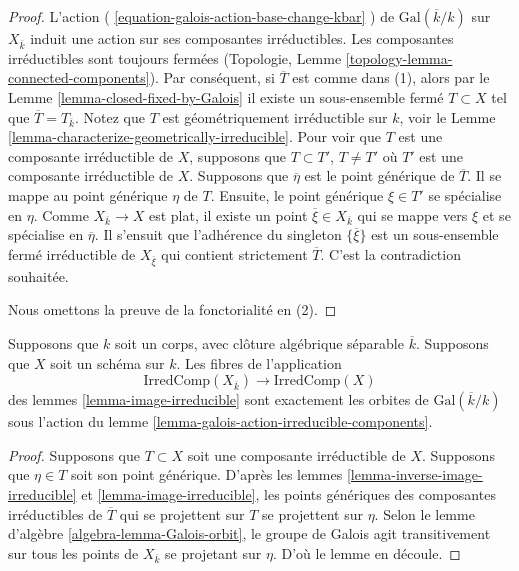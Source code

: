\begin{proof}
L'action ( \ref{equation-galois-action-base-change-kbar} ) de
$\text{Gal}(\overline{k}/k)$ sur $X_{\overline{k}}$ induit
une action sur ses composantes irréductibles. Les composantes
irréductibles sont toujours fermées (Topologie, Lemme
\ref{topology-lemma-connected-components}). Par conséquent, si
$\overline{T}$ est comme dans (1), alors par le Lemme
\ref{lemma-closed-fixed-by-Galois} il existe un sous-ensemble
fermé $T \subset X$ tel que $\overline{T} = T_{\overline{k}}$.
Notez que $T$ est géométriquement irréductible sur $k$, voir le
Lemme \ref{lemma-characterize-geometrically-irreducible}. Pour
voir que $T$ est une composante irréductible de $X$, supposons
que $T \subset T'$, $T \not = T'$ où $T'$ est une composante
irréductible de $X$. Supposons que $\overline{\eta}$ est le
point générique de $\overline{T}$. Il se mappe au point
générique $\eta$ de $T$. Ensuite, le point générique $\xi \in
T'$ se spécialise en $\eta$. Comme $X_{\overline{k}} \to X$ est
plat, il existe un point $\overline{\xi} \in X_{\overline{k}}$
qui se mappe vers $\xi$ et se spécialise en $\overline{\eta}$. Il
s'ensuit que l'adhérence du singleton $\{\overline{\xi}\}$ est un
sous-ensemble fermé irréductible de $X_{\overline{\xi}}$ qui
contient strictement $\overline{T}$. C'est la contradiction souhaitée.

\medskip\noindent
Nous omettons la preuve de la fonctorialité en (2).
\end{proof}

\begin{lemma}
\label{lemma-orbit-irreducible-components}
Supposons que $k$ soit un corps, avec clôture
algébrique séparable $\overline{k}$. Supposons que
$X$ soit un schéma sur $k$. Les fibres de l'application
$$
\text{IrredComp}(X_{\overline{k}})
\longrightarrow
\text{IrredComp}(X)
$$
des lemmes \ref{lemma-image-irreducible}
sont exactement les orbites de
$\text{Gal}(\overline{k}/k)$ sous l'action du lemme
\ref{lemma-galois-action-irreducible-components}.
\end{lemma}

\begin{proof}
Supposons que $T \subset X$ soit une composante
irréductible de $X$. Supposons que $\eta \in T$ soit
son point générique. D'après les lemmes
\ref{lemma-inverse-image-irreducible} et
\ref{lemma-image-irreducible}, les points génériques des
composantes irréductibles de $\overline{T}$ qui se
projettent sur $T$ se projettent sur $\eta$. Selon le lemme
d'algèbre \ref{algebra-lemma-Galois-orbit}, le groupe de
Galois agit transitivement sur tous les points de
$X_{\overline{k}}$ se projetant sur $\eta$. D'où le lemme en découle.
\end{proof}

